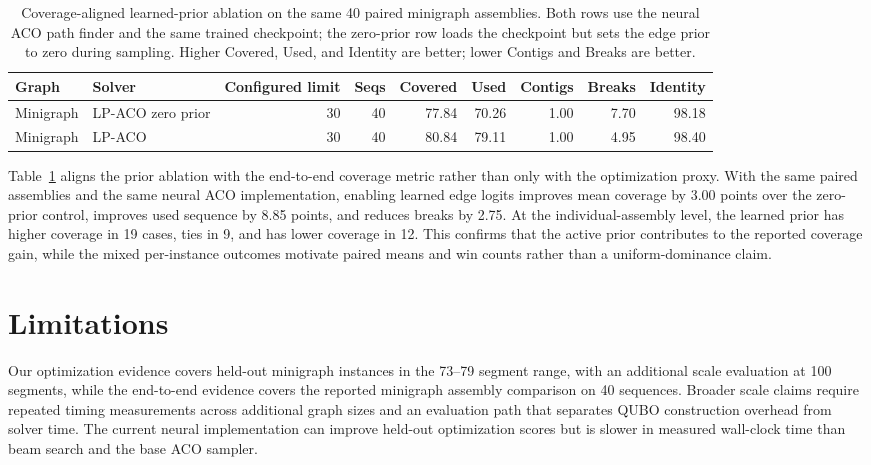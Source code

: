 \documentclass[11pt]{article}
\begin{document}
\begin{table}[t]
\centering
\small
\caption{Coverage-aligned learned-prior ablation on the same 40 paired minigraph assemblies. Both rows use the neural ACO path finder and the same trained checkpoint; the zero-prior row loads the checkpoint but sets the edge prior to zero during sampling. Higher Covered, Used, and Identity are better; lower Contigs and Breaks are better.}
\label{tab:coverage-prior-ablation}
\begin{tabular}{llrrrrrrr}
\hline
Graph & Solver & Configured limit & Seqs & Covered & Used & Contigs & Breaks & Identity \\
\hline
Minigraph & LP-ACO zero prior & 30 & 40 & 77.84 & 70.26 & 1.00 & 7.70 & 98.18 \\
Minigraph & LP-ACO & 30 & 40 & 80.84 & 79.11 & 1.00 & 4.95 & 98.40 \\
\hline
\end{tabular}
\end{table}

Table~\ref{tab:coverage-prior-ablation} aligns the prior ablation with the end-to-end coverage metric rather than only with the optimization proxy. With the same paired assemblies and the same neural ACO implementation, enabling learned edge logits improves mean coverage by 3.00 points over the zero-prior control, improves used sequence by 8.85 points, and reduces breaks by 2.75. At the individual-assembly level, the learned prior has higher coverage in 19 cases, ties in 9, and has lower coverage in 12. This confirms that the active prior contributes to the reported coverage gain, while the mixed per-instance outcomes motivate paired means and win counts rather than a uniform-dominance claim.

\section{Limitations}

Our optimization evidence covers held-out minigraph instances in the 73--79 segment range, with an additional scale evaluation at 100 segments, while the end-to-end evidence covers the reported minigraph assembly comparison on 40 sequences. Broader scale claims require repeated timing measurements across additional graph sizes and an evaluation path that separates QUBO construction overhead from solver time. The current neural implementation can improve held-out optimization scores but is slower in measured wall-clock time than beam search and the base ACO sampler.
\end{document}
